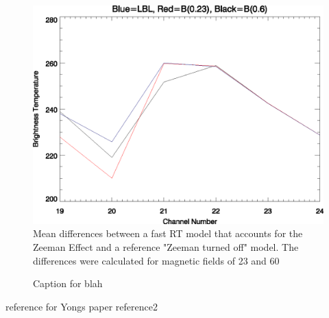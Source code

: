 \begin{figure}[htp]
  \centering{}
  \includegraphics[scale=0.8]{./graphics/Figure5.eps}
  \caption{Mean differences between a fast RT model that accounts for the Zeeman Effect and a reference "Zeeman turned off"
   model. The differences were calculated for magnetic fields of 23\microtesla{} and 60\microtesla{}}
  \label{fig:xx}
\end{figure}






\newpage





\begin{figure}[htp]
  \centering
  \caption{Caption for blah}
  \label{fig:blah_ref}
\end{figure}



\begin{thebibliography}{99}
   reference for Yongs paper
   reference2
\end{thebibliography}



\begin{appendix}
\end{appendix}




